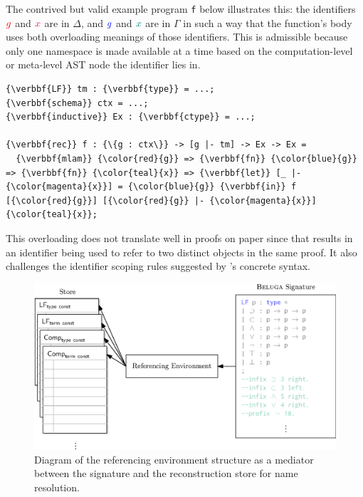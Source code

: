 The contrived but valid example program \verb*|f| below illustrates this: the identifiers ${\color{red}{g}}$ and ${\color{magenta}{x}}$ are in $\Delta$, and ${\color{blue}{g}}$ and ${\color{teal}{x}}$ are in $\Gamma$ in such a way that the function's body uses both overloading meanings of those identifiers.
This is admissible because only one namespace is made available at a time based on the computation-level or meta-level \ac{AST} node the identifier lies in.
\begin{center}
\begin{minipage}{\textwidth}
\begin{Verbatim}[commandchars=\\\{\}, baselinestretch=1]
{\verbbf{LF}} tm : {\verbbf{type}} = ...;
{\verbbf{schema}} ctx = ...;
{\verbbf{inductive}} Ex : {\verbbf{ctype}} = ...;

{\verbbf{rec}} f : {\{g : ctx\}} -> [g |- tm] -> Ex -> Ex =
  {\verbbf{mlam}} {\color{red}{g}} => {\verbbf{fn}} {\color{blue}{g}} => {\verbbf{fn}} {\color{teal}{x}} => {\verbbf{let}} [_ |- {\color{magenta}{x}}] = {\color{blue}{g}} {\verbbf{in}} f [{\color{red}{g}}] [{\color{red}{g}} |- {\color{magenta}{x}}] {\color{teal}{x}};

\end{Verbatim}
\end{minipage}
\end{center}
This overloading does not translate well in proofs on paper since that results in an identifier being used to refer to two distinct objects in the same proof.
It also challenges the identifier scoping rules suggested by \Beluga's concrete syntax.

\begin{figure}[htb]
\centering
\includegraphics{figures/referencing-environment-architecture.eps}
\caption[Role of the referencing environment in \Beluga]{%
Diagram of the referencing environment structure as a mediator between the \Beluga signature and the reconstruction store for name resolution.
}
\label{figure:referencing-environment-architecture}
\end{figure}

